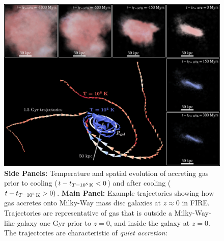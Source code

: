 \documentclass[fleqn,usenatbib]{mnras}
\newcommand{\tcon}{t_{T=10^5\,{\rm K}}}
\begin{document}
\begin{figure}
    \centering
    \includegraphics[width=\textwidth]{figures/illustrative_tracks/illustrative_tracks.png}
    \caption{
\textbf{Side Panels:}
Temperature and spatial evolution of accreting gas prior to cooling ($t-\tcon < 0$) and after cooling ($t-\tcon > 0)$.
\textbf{Main Panel:}
Example trajectories showing how gas accretes onto Milky-Way mass disc galaxies at $z\approx0$ in FIRE.
Trajectories are representative of gas that is outside a Milky-Way-like galaxy one Gyr prior to $z=0$, and inside the galaxy at $z=0$.
The trajectories are characteristic of \textit{quiet accretion}:
    }
    \label{f: overview}
\end{figure}
\end{document}
